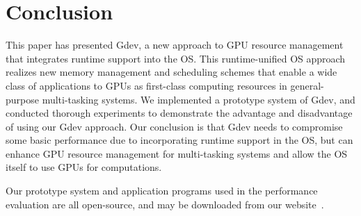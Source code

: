 \vspace{-0.25em}
\section{Conclusion}
\label{sec:conclusion}
\vspace{-0.25em}

This paper has presented Gdev, a new approach to GPU resource management
that integrates runtime support into the OS.
This runtime-unified OS approach realizes new memory management and
scheduling schemes that enable a wide class of applications to GPUs as
first-class computing resources in general-purpose multi-tasking systems.
We implemented a prototype system of Gdev, and conducted thorough
experiments to demonstrate the advantage and disadvantage of using our
Gdev approach. 
Our conclusion is that Gdev needs to compromise some basic performance
due to incorporating runtime support in the OS, but can enhance GPU resource
management for multi-tasking systems and allow the OS itself to use
GPUs for computations.

Our prototype system and application programs used in the performance
evaluation are all open-source, and may be downloaded from our website~\cite{Gdev}.
